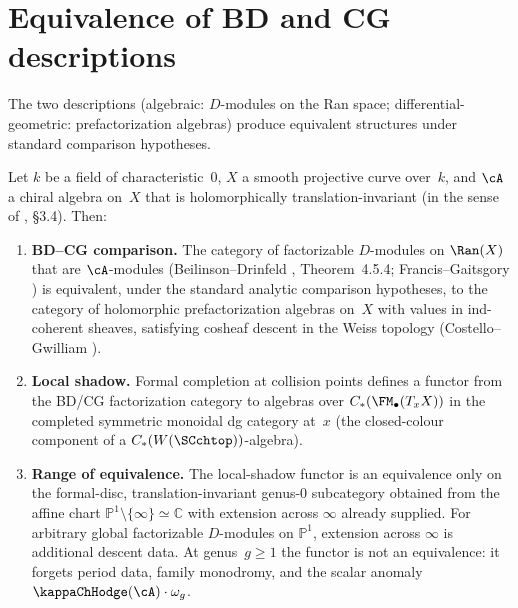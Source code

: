 \section{Equivalence of BD and CG descriptions}
\label{sec:BD-CG-equivalence}

The two descriptions (algebraic: $D$-modules on the Ran space;
differential-geometric: prefactorization algebras) produce
equivalent structures under standard comparison hypotheses.

\begin{theorem}
\label{thm:BD-CG-equivalence}
Let $k$ be a field of characteristic~$0$, $X$ a smooth projective
curve over~$k$, and $\cA$ a chiral algebra on~$X$ that is
holomorphically translation-invariant (in the sense of
\textup{\cite{BD04}, \S3.4}). Then:
\begin{enumerate}[label=\textup{(\roman*)}]
\item \textbf{BD--CG comparison.} The category of
 factorizable $D$-modules on $\Ran(X)$ that are $\cA$-modules
 \textup{(}Beilinson--Drinfeld \textup{\cite{BD04}},
 Theorem~\textup{4.5.4; Francis--Gaitsgory \cite{FG12})}
 is equivalent, under the standard analytic comparison hypotheses,
 to the category of holomorphic
 prefactorization algebras on~$X$ with values in ind-coherent
 sheaves, satisfying cosheaf descent in the Weiss topology
 \textup{(}Costello--Gwilliam \textup{\cite{CG17})}.

\item \textbf{Local shadow.} Formal completion at collision points
 defines a functor from the BD/CG factorization category to algebras
 over
 $C_\ast(\FM_\bullet(T_xX))$ in the completed symmetric monoidal dg
 category at~$x$ \textup{(}the closed-colour component of
 a $C_\ast(W(\SCchtop))$-algebra\textup{)}.

\item \textbf{Range of equivalence.} The local-shadow functor is an
 equivalence only on the formal-disc, translation-invariant
 genus-$0$ subcategory obtained from the affine chart
 $\mathbb P^1\setminus\{\infty\}\simeq \mathbb C$ with extension
 across $\infty$ already supplied. For arbitrary global
 factorizable $D$-modules on $\mathbb P^1$, extension across
 $\infty$ is additional descent data. At genus~$g\ge 1$ the
 functor is not an equivalence: it forgets period data, family
 monodromy, and the scalar anomaly $\kappaChHodge(\cA)\cdot\omega_g$.
\end{enumerate}
\end{theorem}

